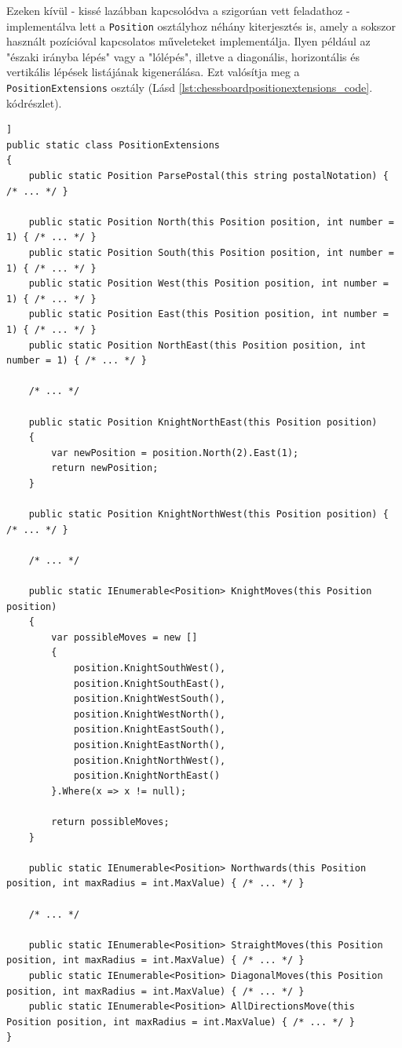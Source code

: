 \documentclass[twoside, a4paper, 12pt]{article}
\begin{document}
Ezeken kívül - kissé lazábban kapcsolódva a szigorúan vett feladathoz - implementálva lett a \texttt{Position} osztályhoz néhány kiterjesztés is, amely a sokszor használt pozícióval kapcsolatos műveleteket implementálja. Ilyen például az "északi irányba lépés" vagy a "lólépés", illetve a diagonális, horizontális és vertikális lépések listájának kigenerálása. Ezt valósítja meg a \texttt{PositionExtensions} osztály (Lásd \ref{lst:chessboardpositionextensions_code}. kódrészlet).

\begin{lstlisting}[caption=Pozíciók segédfüggvényes - PositionExtensions osztály, label=lst:chessboardpositionextensions_code, float,floatplacement=H]]
public static class PositionExtensions
{
	public static Position ParsePostal(this string postalNotation) { /* ... */ }
	
	public static Position North(this Position position, int number = 1) { /* ... */ }
	public static Position South(this Position position, int number = 1) { /* ... */ }
	public static Position West(this Position position, int number = 1) { /* ... */ }
	public static Position East(this Position position, int number = 1) { /* ... */ }
	public static Position NorthEast(this Position position, int number = 1) { /* ... */ }
	
	/* ... */
	
	public static Position KnightNorthEast(this Position position)
	{
		var newPosition = position.North(2).East(1);
		return newPosition;
	}
	
	public static Position KnightNorthWest(this Position position) { /* ... */ }
	
	/* ... */
	
	public static IEnumerable<Position> KnightMoves(this Position position)
	{
		var possibleMoves = new []
		{
			position.KnightSouthWest(),
			position.KnightSouthEast(),
			position.KnightWestSouth(),
			position.KnightWestNorth(),
			position.KnightEastSouth(),
			position.KnightEastNorth(),
			position.KnightNorthWest(),
			position.KnightNorthEast()
		}.Where(x => x != null);
		
		return possibleMoves;
	}
	
	public static IEnumerable<Position> Northwards(this Position position, int maxRadius = int.MaxValue) { /* ... */ }
	
	/* ... */
	
	public static IEnumerable<Position> StraightMoves(this Position position, int maxRadius = int.MaxValue) { /* ... */ }
	public static IEnumerable<Position> DiagonalMoves(this Position position, int maxRadius = int.MaxValue) { /* ... */ }
	public static IEnumerable<Position> AllDirectionsMove(this Position position, int maxRadius = int.MaxValue) { /* ... */ }
}

\end{lstlisting}
\end{document}
